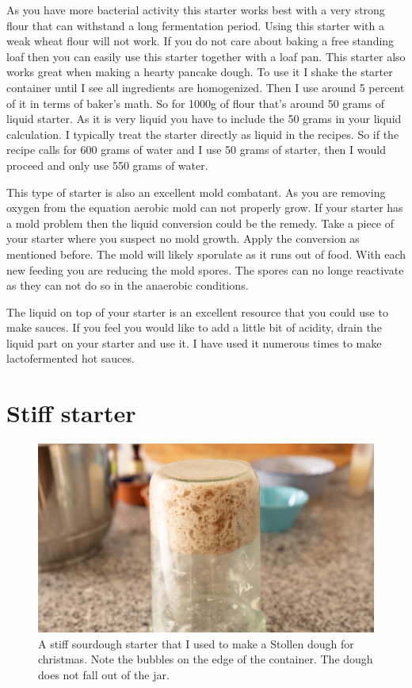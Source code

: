 As you have more bacterial activity this starter works best with a very strong
flour that can withstand a long fermentation period. Using this starter with a
weak wheat flour will not work. If you do not care about baking a free
standing loaf then you can easily use this starter together with a loaf pan.
This starter also works great when making a hearty pancake dough. To use it I
shake the starter container until I see all ingredients are homogenized. Then
I use around 5 percent of it in terms of baker's math. So for 1000g of flour
that's around 50 grams of liquid starter. As it is very liquid you have to
include the 50 grams in your liquid calculation. I typically treat the starter
directly as liquid in the recipes. So if the recipe calls for 600 grams of water
and I use 50 grams of starter, then I would proceed and only use 550 grams of
water.

This type of starter is also an excellent mold combatant. As you are removing
oxygen from the equation aerobic mold can not properly grow. If your starter
has a mold problem then the liquid conversion could be the remedy. Take a
piece of your starter where you suspect no mold growth. Apply the conversion
as mentioned before. The mold will likely sporulate as it runs out of food.
With each new feeding you are reducing the mold spores. The spores can no
longe reactivate as they can not do so in the anaerobic conditions.

The liquid on top of your starter is an excellent resource that you could use
to make sauces. If you feel you would like to add a little bit of acidity,
drain the liquid part on your starter and use it. I have used it numerous
times to make lactofermented hot sauces.

\section{Stiff starter}

\begin{figure}[!htb]
  \includegraphics[width=\textwidth]{sourdough-starter-stiff.jpg}
  \caption{A stiff sourdough starter that I used to make a Stollen dough for christmas. Note
  the bubbles on the edge of the container. The dough does not fall out of the jar.}
  \label{fig:stiff-sourdough-starter}
\end{figure}

